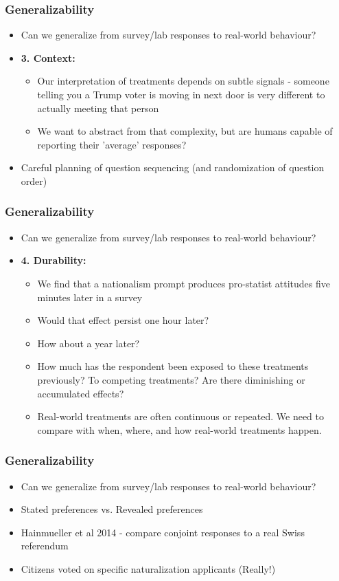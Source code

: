 \documentclass[xcolor=x11names,compress]{beamer}\usepackage[]{graphicx}\usepackage[]{color}
\renewcommand{\(}{\begin{columns}}
\renewcommand{\)}{\end{columns}}
\newcommand{\<}[1]{\begin{column}{#1}}
\renewcommand{\>}{\end{column}}
\begin{document}
\begin{frame}
\frametitle{Generalizability}
\begin{itemize}
\item Can we generalize from survey/lab responses to real-world behaviour?
\pause
\item \textbf{3. Context:} 
\begin{itemize}
\pause
\item Our interpretation of treatments depends on subtle signals - someone telling you a Trump voter is moving in next door is very different to actually meeting that person
\pause
\item We want to abstract from that complexity, but are humans capable of reporting their 'average' responses?
\end{itemize}
\pause
\item Careful planning of question sequencing (and randomization of question order)
\end{itemize}
\end{frame}

\begin{frame}
\frametitle{Generalizability}
\begin{itemize}
\item Can we generalize from survey/lab responses to real-world behaviour?
\pause
\item \textbf{4. Durability:} 
\begin{itemize}
\pause
\item We find that a nationalism prompt produces pro-statist attitudes five minutes later in a survey
\pause
\item Would that effect persist one hour later?
\pause
\item How about a year later?
\pause
\item How much has the respondent been exposed to these treatments previously? To competing treatments? Are there diminishing or accumulated effects?
\pause
\item Real-world treatments are often continuous or repeated. We need to compare with when, where, and how real-world treatments happen.
\end{itemize}
\end{itemize}
\end{frame}

\begin{frame}
\frametitle{Generalizability}
\begin{itemize}
\item Can we generalize from survey/lab responses to real-world behaviour?
\pause
\item Stated preferences vs. Revealed preferences
\pause
\item Hainmueller et al 2014 - compare conjoint responses to a real Swiss referendum
\pause
\item Citizens voted on specific naturalization applicants (Really!)
\end{itemize}
\end{frame}
\end{document}
